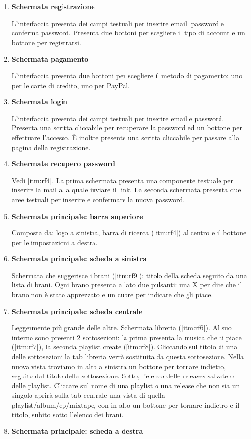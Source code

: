 \documentclass[a4paper,12pt]{article}
\begin{document}
\begin{enumerate}[label=\textbf{FE\arabic*}\;, ref=\textbf{FE\arabic*}]
    \item \label{itm:fe1} \textbf{Schermata registrazione}
    
    L'interfaccia presenta dei campi testuali per inserire email, password e conferma password. Presenta due bottoni per scegliere il tipo di account e un bottone per registrarsi.
    \item \label{itm:fe2} \textbf{Schermata pagamento}
    
    L'interfaccia presenta due bottoni per scegliere il metodo di pagamento: uno per le carte di credito, uno per PayPal.
    \item \label{itm:fe3} \textbf{Schermata login}
    
    L'interfaccia presenta dei campi testuali per inserire email e password. Presenta una scritta cliccabile per recuperare la password ed un bottone per effettuare l'accesso. È inoltre presente una scritta cliccabile per passare alla pagina della registrazione.
    \item \label{itm:fe4} \textbf{Schermate recupero password}
    
    Vedi \ref{itm:rf4}. La prima schermata presenta una componente testuale per inserire la mail alla quale inviare il link. La seconda schermata presenta due aree testuali per inserire e confermare la nuova password.
    \item \label{itm:fe5} \textbf{Schermata principale: barra superiore}
    
    Composta da: logo a sinistra, barra di ricerca (\ref{itm:rf4}) al centro e il bottone per le impostazioni a destra. 
    \item \label{itm:fe6} \textbf{Schermata principale: scheda a sinistra}
    
    Schermata che suggerisce i brani (\ref{itm:rf9}): titolo della scheda seguito da una lista di brani. Ogni brano presenta a lato due pulsanti: una X per dire che il brano non è stato apprezzato e un cuore per indicare che gli piace.
    \item \label{itm:fe7} \textbf{Schermata principale: scheda centrale}
    
    Leggermente più grande delle altre. Schermata libreria (\ref{itm:rf6}). Al suo interno sono presenti 2 sottosezioni: la prima presenta la musica che ti piace (\ref{itm:rf7}), la seconda playlist create (\ref{itm:rf8}). Cliccando sul titolo di una delle sottosezioni la tab libreria verrà sostituita da questa sottosezione. Nella nuova vista troviamo in alto a sinistra un bottone per tornare indietro, seguito dal titolo della sottosezione. Sotto, l’elenco delle releases salvate o delle playlist. Cliccare sul nome di una playlist o una release che non sia un singolo aprirà sulla tab centrale una vista di quella playlist/album/ep/mixtape, con in alto un bottone per tornare indietro e il titolo, subito sotto l'elenco dei brani.
    \item \label{itm:fe8} \textbf{Schermata principale: scheda a destra}
    

\end{enumerate}
\end{document}
